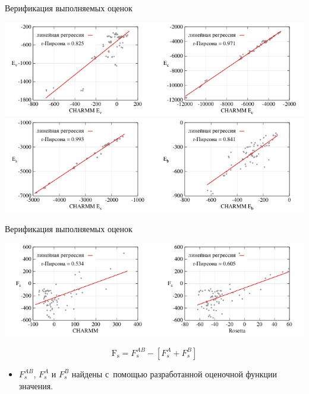 \documentclass[sans,aspectratio=169]{beamer}
\begin{document}
\begin{frame}{Верификация выполняемых оценок}
	\fontsize{11}{12}\selectfont
	\hangindent=-0.5cm
	 \noindent
	\setlength{\leftmargini}{20pt}
	
	\centering
	\vspace{-3pt}
	\includegraphics[scale=0.9]{images/first.pdf}
	\vspace{4mm}
	\includegraphics[scale=0.9]{images/second.pdf}
	
\end{frame}



\begin{frame}{Верификация выполняемых оценок}
	\fontsize{11}{12}\selectfont
	\hangindent=-0.5cm
	 \noindent
	\setlength{\leftmargini}{20pt}
	
	\centering
	\vspace{-3pt}
	\includegraphics[scale=0.9]{images/third.pdf}
	
	\vspace{4mm}
	\[\text{F}_{\text{s}}=F_{s}^{AB} - \left[F_{s}^{A} + F_{s}^{B}\right]\]
	
	\begin{itemize}
		\item $F_{s}^{AB}$, $F_{s}^{A}$ и $F_{s}^{B}$ найдены с~помощью разработанной оценочной функции значения.
	\end{itemize}
	
\end{frame}
\end{document}
